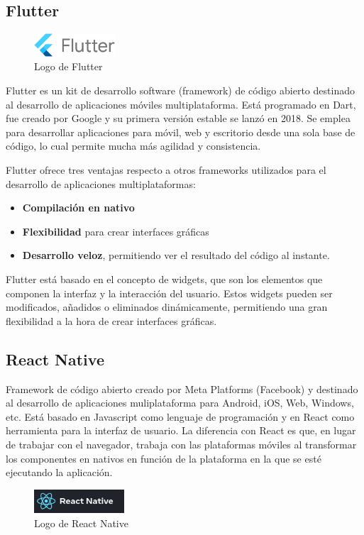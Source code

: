 \subsection{Flutter}
\begin{figure}
\vspace*{-0.4cm}
\centering
\includegraphics[width=0.27\textwidth]{imagenes/c2/flutter.png}

\caption{Logo de Flutter}
\end{figure}Flutter es un kit de desarrollo software (framework) de código abierto destinado al desarrollo de aplicaciones móviles multiplataforma. Está programado en Dart, fue creado por Google y su primera versión estable se lanzó en 2018.
Se emplea para desarrollar aplicaciones para móvil, web y escritorio desde una sola base de código, lo cual permite mucha más agilidad y consistencia.

Flutter ofrece tres ventajas respecto a otros frameworks utilizados para el desarrollo de aplicaciones multiplataformas:

\begin{itemize}
\item \textbf{Compilación en nativo}
\item \textbf{Flexibilidad} para crear interfaces gráficas
\item \textbf{Desarrollo veloz}, permitiendo ver el resultado del código al instante.

\end{itemize}
Flutter está basado en el concepto de widgets, que son los elementos que componen la interfaz y la interacción del usuario. Estos widgets pueden ser modificados, añadidos o eliminados
dinámicamente, permitiendo una gran flexibilidad a la hora de crear interfaces gráficas. 

\subsection{React Native}
Framework de código abierto creado por Meta Platforms (Facebook) y destinado al desarrollo de aplicaciones muliplataforma para Android, iOS, Web, Windows, etc.
Está basado en Javascript como lenguaje de programación y en React como herramienta para la interfaz de usuario. La diferencia con React es que, en lugar de 
trabajar con el navegador, trabaja con las plataformas móviles al transformar los componentes en nativos en función de la plataforma en la que se esté
ejecutando la aplicación. 
\begin{figure}[H]
    \centering
    \includegraphics[width=0.3\textwidth]{imagenes/c2/reactnative.png}
    \caption{Logo de React Native}
    \end{figure}
    
